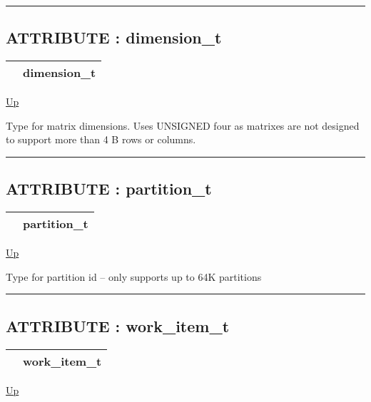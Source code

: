 \rule{\textwidth}{0.4pt}

\subsection*{ATTRIBUTE : dimension\_t}
\hypertarget{ecldoc:pbblas.types.dimension_t}{}

{\renewcommand{\arraystretch}{1.5}
\begin{tabularx}{\textwidth}{|>{\raggedright\arraybackslash}l|X|}
\hline
\hspace{0pt} & dimension\_t \\
\hline
\end{tabularx}
}

\hyperlink{ecldoc:PBblas.Types}{Up}

\par
Type for matrix dimensions. Uses UNSIGNED four as matrixes are not designed to support more than 4 B rows or columns.


\rule{\textwidth}{0.4pt}
\subsection*{ATTRIBUTE : partition\_t}
\hypertarget{ecldoc:pbblas.types.partition_t}{}

{\renewcommand{\arraystretch}{1.5}
\begin{tabularx}{\textwidth}{|>{\raggedright\arraybackslash}l|X|}
\hline
\hspace{0pt} & partition\_t \\
\hline
\end{tabularx}
}

\hyperlink{ecldoc:PBblas.Types}{Up}

\par
Type for partition id -- only supports up to 64K partitions


\rule{\textwidth}{0.4pt}
\subsection*{ATTRIBUTE : work\_item\_t}
\hypertarget{ecldoc:pbblas.types.work_item_t}{}

{\renewcommand{\arraystretch}{1.5}
\begin{tabularx}{\textwidth}{|>{\raggedright\arraybackslash}l|X|}
\hline
\hspace{0pt} & work\_item\_t \\
\hline
\end{tabularx}
}

\hyperlink{ecldoc:PBblas.Types}{Up}

